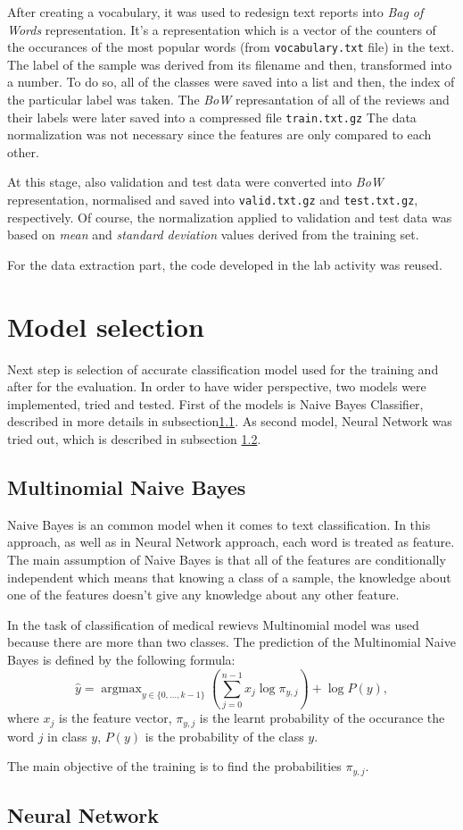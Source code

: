 \documentclass{article}
\DeclareMathOperator*{\argmax}{argmax}
\begin{document}
After creating a vocabulary, it was used to redesign text reports into \textit{Bag of Words} representation. It's a representation which is a vector of the counters of the occurances of the most popular words (from \texttt{vocabulary.txt} file) in the text. The label of the sample was derived from its filename and then, transformed into a number. To do so, all of the classes were saved into a list and then, the index of the particular label was taken. The \textit{BoW} represantation of all of the reviews and their labels were later saved into a compressed file \texttt{train.txt.gz} The data normalization was not necessary since the features are only compared to each other.

At this stage, also validation and test data were converted into \textit{BoW} representation, normalised and saved into \texttt{valid.txt.gz} and \texttt{test.txt.gz}, respectively. Of course, the normalization applied to validation and test data was based on \textit{mean} and \textit{standard deviation} values derived from the training set.

For the data extraction part, the code developed in the lab activity was reused.

\section{Model selection}
Next step is selection of accurate classification model used for the training and after for the evaluation. In order to have wider perspective, two models were implemented, tried and tested. First of the models is Naive Bayes Classifier, described in more details in subsection\ref{subsection:naive_bayes}. As second model, Neural Network was tried out, which is described in subsection \ref{subsection:neural_network}.

\subsection{Multinomial Naive Bayes}
\label{subsection:naive_bayes}
Naive Bayes is an common model when it comes to text classification. In this approach, as well as in Neural Network approach, each word is treated as feature. The main assumption of Naive Bayes is that all of the features are conditionally independent which means that knowing a class of a sample, the knowledge about one of the features doesn't give any knowledge about any other feature.

In the task of classification of medical rewievs Multinomial model was used because there are more than two classes. The prediction of the Multinomial Naive Bayes is defined by the following formula:
\begin{equation}
    \hat{y} = \argmax_{y \in \{0, ..., k-1\}} \left( \sum^{n - 1}_{j = 0} x_j \log \pi_{y, j} \right) + \log P(y),
\end{equation}
where $x_j$ is the feature vector, $\pi_{y, j}$ is the learnt probability of the occurance the word $j$ in class $y$, $P(y)$ is the probability of the class $y$.

The main objective of the training is to find the probabilities $\pi_{y, j}$.



\subsection{Neural Network}
\label{subsection:neural_network}
\end{document}
